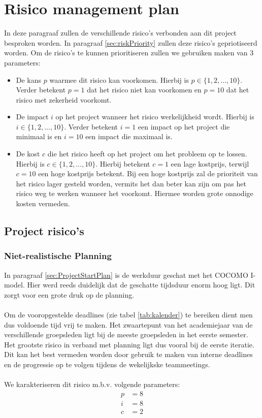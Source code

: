 \section{Risico management plan} \label{sec:risicoManagementPlan}
In deze paragraaf zullen de verschillende risico's verbonden aan dit project besproken worden. In paragraaf \ref{sec:riskPriority} zullen deze risico's gepriotiseerd worden. Om de risico's te kunnen prioritiseren zullen we gebruiken maken van 3 parameters:
\begin{itemize}
	\item 
		De kans $p$ waarmee dit risico kan voorkomen. Hierbij is $ p \in \{1, 2, \ldots , 10\} $. Verder betekent $p = 1$ dat het risico niet kan voorkomen en $p = 10$ dat het risico met zekerheid voorkomt.
	\item 
		De impact $i$ op het project wanneer het risico werkelijkheid wordt. Hierbij is $ i \in \{1, 2, \ldots , 10\} $. Verder betekent $i = 1$ een impact op het project die minimaal is en $i = 10$ een impact die maximaal is.
	\item 
		De kost $c$ die het risico heeft op het project om het probleem op te lossen. Hierbij is $ c \in \{1, 2, \ldots , 10\} $. Hierbij betekent $c = 1$ een lage kostprijs, terwijl $c=10$ een hoge kostprijs betekent. Bij een hoge kostprijs zal de prioriteit van het risico lager gesteld worden, vermits het dan beter kan zijn om pas het risico weg te werken wanneer het voorkomt. Hiermee worden grote onnodige kosten vermeden.
		
\end{itemize}
\subsection{Project risico's}
\subsubsection{Niet-realistische Planning}
In paragraaf \ref{sec:ProjectStartPlan} is de werkduur geschat met het COCOMO I-model. Hier werd reeds duidelijk dat de geschatte tijdsduur enorm hoog ligt. Dit zorgt voor een grote druk op de planning.
\\
\\
Om de vooropgestelde deadlines (zie tabel \ref{tab:kalender}) te bereiken dient men dus voldoende tijd vrij te maken. Het zwaartepunt van het academiejaar van de verschillende groepsleden ligt bij de meeste groepsleden in het eerste semester. Het grootste risico in verband met planning ligt dus vooral bij de eerste iteratie. Dit kan het best vermeden worden door gebruik te maken van interne deadlines en de progressie op te volgen tijdens de wekelijkske teammeetings.
\\
\\
We karakteriseren dit risico m.b.v. volgende parameters:
\begin{align*}
	p &= 8\\
	i &= 8\\
	c &= 2
\end{align*}

